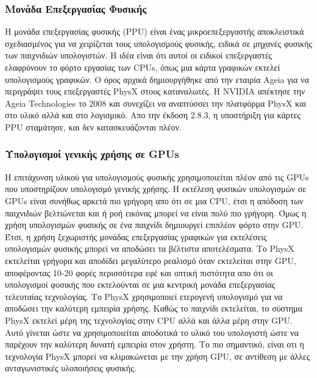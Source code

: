 \subsubsection{Μονάδα Επεξεργασίας Φυσικής}
Η μονάδα επεξεργασίας φυσικής (PPU) είναι ένας μικροεπεξεργαστής αποκλειστικά σχεδιασμένος για να χειρίζεται τους υπολογισμούς φυσικής, ειδικά σε μηχανές φυσικής των παιχνιδιών υπολογιστών. Η ιδέα είναι ότι αυτοί οι ειδικοί επεξεργαστές ελαφρύνουν το φόρτο εργασίας των CPUs, όπως μια κάρτα γραφικών εκτελεί υπολογισμούς γραφικών. Ο όρος αρχικά δημιουργήθηκε από την εταιρία Ageia για να περιγράψει τους επεξεργαστές PhysX στους καταναλωτές.
H NVIDIA απέκτησε την Ageia Technologies το 2008 και συνεχίζει να αναπτύσσει την πλατφόρμα PhysX και στο υλικό αλλά και στο λογισμικό. Απο την έκδοση 2.8.3, η υποστήριξη για κάρτες PPU σταμάτησε, και δεν κατασκευάζονται πλέον.  
\subsubsection{Υπολογισμοί γενικής χρήσης σε GPUs}
Η επιτάχυνση υλικού για υπολογισμούς φυσικής χρησιμοποιείται πλέον από τις GPUs που υποστηρίζουν υπολογισμό γενικής χρήσης. Η εκτέλεση φυσικών υπολογισμών σε GPUs είναι συνήθως αρκετά πιο γρήγορη απο ότι σε μια CPU, έτσι η απόδοση των παιχνιδιών βελτιώνεται και ή ροή εικόνας μπορεί να είναι πολύ πιο γρήγορη. Όμως η χρήση υπολογισμών φυσικής σε ένα παιχνίδι δημιουργεί επιπλέον φόρτο στην GPU. Έτσι, η χρήση ξεχωριστής μονάδας επεξεργασίας γραφικών για εκτελέσεις υπολογισμών φυσικής μπορεί να αποδώσει τα βέλτιστα αποτελέσματα. Το PhysX εκτελείται γρήγορα και αποδίδει μεγαλύτερο ρεαλισμό όταν εκτελείται στην GPU, αποφέροντας 10-20 φορές περισσότερα εφέ και οπτική πιστότητα απο ότι οι υπολογισμοί φυσικής που εκτελούνται σε μια κεντρική μονάδα επεξεργασίας τελευταίας τεχνολογίας. Το PhysX χρησιμοποιεί ετερογενή υπολογισμό για να αποδώσει την καλύτερη εμπειρία χρήσης. Καθώς το παιχνίδι εκτελείται, το σύστημα PhysX εκτελεί μέρη της τεχνολογίας στην CPU αλλά και άλλα μέρη στην GPU. Αυτό γίνεται ώστε να χρησιμοποιείται αποδοτικά το υλικό του υπολογιστή ώστε να παρέχουν την καλύτερη δυνατή εμπειρία στον χρήστη. Το πιο σημαντικό, είναι οτι η τεχνολογία PhysX μπορεί να κλιμακώνεται με την χρήση GPU, σε αντίθεση με άλλες ανταγωνιστικές υλοποιήσεις φυσικής.
